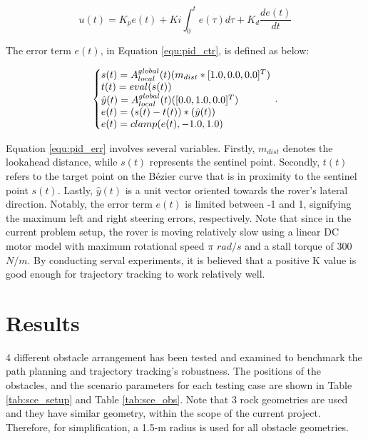 \documentclass{article}
\begin{document}
\begin{equation}
	\label{equ:pid_ctr}
	u(t) = K_{p}e(t) + K{i}\int_{0}^{t}e(\tau)d\tau+K_{d}\frac{de(t)}{dt}
\end{equation}

The error term $e(t)$, in Equation \ref{equ:pid_ctr}, is defined as below: 

\begin{equation}
	\label{equ:pid_err}
	\left\{\begin{array}{@{}l@{}}
	s(t) = A_{local}^{global}(t)(m_{dist}*[1.0, 0.0, 0.0]^{T})  \\
	t(t) = eval(s(t)) \\
	\hat{y}(t) = A_{local}^{global}(t)([0.0, 1.0, 0.0]^{T})  \\
	e(t) = (s(t)-t(t))*(\hat{y}(t)) \\ 
	e(t) = clamp(e(t),-1.0, 1.0)  \\
	\end{array}\right.\,.
\end{equation}


Equation \ref{equ:pid_err} involves several variables. Firstly, $m_{dist}$ denotes the lookahead distance, while $s(t)$ represents the sentinel point. Secondly, $t(t)$ refers to the target point on the Bézier curve that is in proximity to the sentinel point $s(t)$. Lastly, $\hat{y}(t)$ is a unit vector oriented towards the rover's lateral direction. Notably, the error term $e(t)$ is limited between -1 and 1, signifying the maximum left and right steering errors, respectively. Note that since in the current problem setup, the rover is moving relatively slow using a linear DC motor model with maximum rotational speed $\pi$ $rad/s$ and a stall torque of 300 $N/m$. By conducting serval experiments, it is believed that a positive K value is good enough for trajectory tracking to work relatively well.

\section{Results}
4 different obstacle arrangement has been tested and examined to benchmark the path planning and trajectory tracking's robustness. The positions of the obstacles, and the scenario parameters for each testing case are shown in Table \ref{tab:sce_setup} and Table \ref{tab:sce_obs}. Note that 3 rock geometries are used and they have similar geometry, within the scope of the current project. Therefore, for simplification, a 1.5-m radius is used for all obstacle geometries. 
\end{document}

